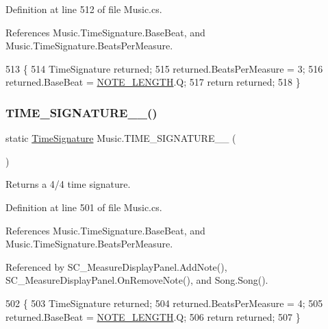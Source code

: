 Definition at line 512 of file Music.\+cs.



References Music.\+Time\+Signature.\+Base\+Beat, and Music.\+Time\+Signature.\+Beats\+Per\+Measure.


\begin{DoxyCode}
513     \{
514         TimeSignature returned;
515         returned.BeatsPerMeasure = 3;
516         returned.BaseBeat = \hyperlink{group___music_enums_gaf11b5f079adbb21c800b9eca1c5c3cbd}{NOTE\_LENGTH}.Q;
517         \textcolor{keywordflow}{return} returned;
518     \}
\end{DoxyCode}
\mbox{\label{group___music_stat_func_gac95af323eef7511543c799154e1c29fd}} 
\subsubsection{\texorpdfstring{T\+I\+M\+E\+\_\+\+S\+I\+G\+N\+A\+T\+U\+R\+E\+\_\+\_()}{TIME\_SIGNATURE\_4\_4()}}
{\footnotesize\ttfamily static \hyperlink{group___music_structs_struct_music_1_1_time_signature}{Time\+Signature} Music.\+T\+I\+M\+E\+\_\+\+S\+I\+G\+N\+A\+T\+U\+R\+E\+\_\+\_ (\begin{DoxyParamCaption}{ }\end{DoxyParamCaption})\hspace{0.3cm}{\ttfamily [static]}}



Returns a 4/4 time signature. 



Definition at line 501 of file Music.\+cs.



References Music.\+Time\+Signature.\+Base\+Beat, and Music.\+Time\+Signature.\+Beats\+Per\+Measure.



Referenced by S\+C\+\_\+\+Measure\+Display\+Panel.\+Add\+Note(), S\+C\+\_\+\+Measure\+Display\+Panel.\+On\+Remove\+Note(), and Song.\+Song().


\begin{DoxyCode}
502     \{
503         TimeSignature returned;
504         returned.BeatsPerMeasure = 4;
505         returned.BaseBeat = \hyperlink{group___music_enums_gaf11b5f079adbb21c800b9eca1c5c3cbd}{NOTE\_LENGTH}.Q;
506         \textcolor{keywordflow}{return} returned;
507     \}
\end{DoxyCode}
\mbox{\label{group___music_stat_func_gabfda54cf40e32a4299de5a2fde753347}} 

